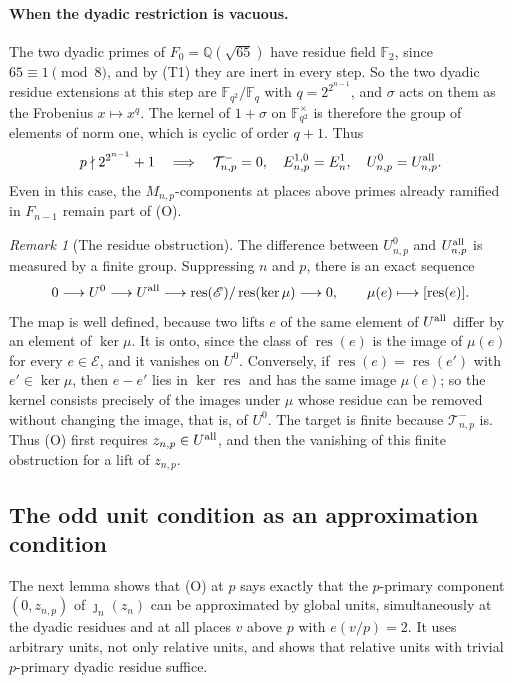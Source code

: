 \documentclass[11pt]{article}
\theoremstyle{plain}
\theoremstyle{definition}
\theoremstyle{remark}
\newtheorem{remark}[theorem]{Remark}
\newcommand{\Q}{\mathbb Q}
\newcommand{\F}{\mathbb F}
\begin{document}
\paragraph{When the dyadic restriction is vacuous.}  The two dyadic
primes of $F_0=\Q(\sqrt{65})$ have residue field $\F_2$, since
$65\equiv1\pmod 8$, and by \textup{(T1)} they are inert in every step.
So the two dyadic residue extensions at this step are $\F_{q^2}/\F_q$
with $q=2^{2^{n-1}}$, and $\sigma$ acts on them as the Frobenius
$x\mapsto x^q$.  The kernel of $1+\sigma$ on $\F_{q^2}^\times$ is
therefore the group of elements of norm one, which is cyclic of order
$q+1$.  Thus
\begin{equation}\label{eq:dyadic-odd-restriction}
 p\nmid 2^{2^{n-1}}+1
 \quad\Longrightarrow\quad
 \mathcal T_{n,p}^-=0,\quad E_{n,p}^{1,0}=E_n^1,
 \quad U_{n,p}^0=U_{n,p}^{\rm all}.
\end{equation}
Even in this case, the $M_{n,p}$-components at places above primes
already ramified in $F_{n-1}$ remain part of (O).

\begin{remark}[The residue obstruction]\label{rem:odd-residue-obstruction}
The difference between $U^0_{n,p}$ and $U^{\rm all}_{n,p}$ is measured
by a finite group.  Suppressing $n$ and $p$, there is an exact sequence
\begin{equation}\label{eq:odd-residue-obstruction}
 0\longrightarrow U^0\longrightarrow U^{\rm all}
 \longrightarrow \operatorname{res}(\mathscr E)/\operatorname{res}(\ker\mu)
 \longrightarrow0,
 \qquad \mu(e)\longmapsto[\operatorname{res}(e)].
\end{equation}
The map is well defined, because two lifts $e$ of the same element of
$U^{\rm all}$ differ by an element of $\ker\mu$.  It is onto, since the class of
$\operatorname{res}(e)$ is the image of $\mu(e)$ for every
$e\in\mathscr E$, and it vanishes on $U^0$.  Conversely, if $\operatorname{res}(e)=
\operatorname{res}(e')$ with $e'\in\ker\mu$, then $e-e'$ lies in
$\ker\operatorname{res}$ and has the same image $\mu(e)$; so the kernel
consists precisely of the images under $\mu$ whose residue can be
removed without changing the image, that is, of $U^0$.  The target is
finite because $\mathcal T^-_{n,p}$ is.  Thus (O) first requires
$z_{n,p}\in U^{\rm all}$, and then the vanishing of this finite
obstruction for a lift of $z_{n,p}$.
\end{remark}

\subsection{The odd unit condition as an approximation condition}\label{sec:odd-approximation}
The next lemma shows that (O) at $p$ says exactly that the $p$-primary
component $(0,z_{n,p})$ of $\jmath_n(z_n)$ can be approximated by global
units, simultaneously at the dyadic residues and at all places $v$ above
$p$ with $e(v/p)=2$.  It uses arbitrary units, not only relative
units, and shows that relative units with trivial $p$-primary dyadic
residue suffice.
\end{document}
